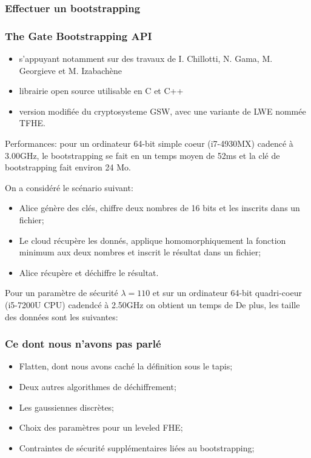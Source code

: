 \documentclass[10pt,xcolor={usenames,dvipsnames}]{beamer}
\begin{document}

\begin{frame} 
\frametitle{Effectuer un bootstrapping}
\end{frame} 


\begin{frame} 
\frametitle{The Gate Bootstrapping API}
\begin{itemize}
\item s'appuyant notamment sur des travaux de I. Chillotti, N. Gama, M. Georgieve et M. Izabachène 
\item librairie open source utilisable en C et C++ 
\item version modifiée du cryptosysteme GSW, avec une variante de LWE nommée TFHE.
\end{itemize}
Performances:
pour un ordinateur 64-bit simple coeur (i7-4930MX) cadencé à 3.00GHz, le bootstrapping se fait en un temps moyen de 52ms
et la clé de bootstrapping fait environ 24 Mo.
 

\end{frame} 

\begin{frame} 
On a considéré le scénario suivant:
\begin{itemize}
\item Alice génère des clés, chiffre deux nombres de 16 bits  et les inscrits dans un fichier;
\item Le cloud récupère les donnés, applique homomorphiquement la fonction minimum aux deux nombres et inscrit le résultat dans un fichier;
\item Alice récupère et déchiffre le résultat.
\end{itemize}
Pour un paramètre de sécurité $\lambda = 110$ et sur un ordinateur 64-bit quadri-coeur (i5-7200U CPU) cadendcé à 2.50GHz
on obtient un temps de 
De plus, les taille des données sont les suivantes:

\end{frame} 


\begin{frame}
\frametitle{Ce dont nous n'avons pas parlé}
\begin{itemize}
\item Flatten, dont nous avons caché la définition sous le tapis;
\item Deux autres algorithmes de déchiffrement;
\item Les gaussiennes discrètes;
\item Choix des paramètres pour un leveled FHE;
\item Contraintes de sécurité supplémentaires liées au bootstrapping;
\end{itemize}
\end{frame}

\end{document}
